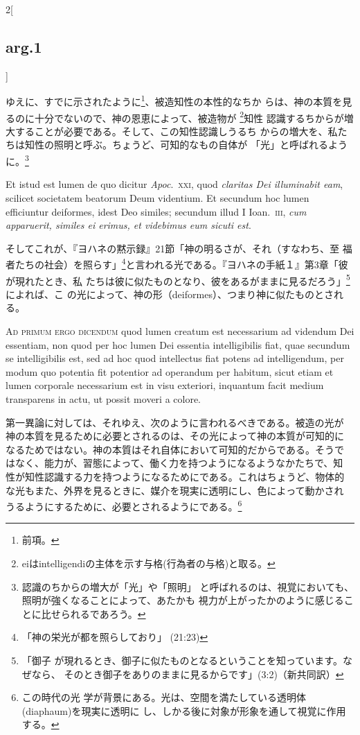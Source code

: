 \documentclass[paper=a4paper,fontsize=10pt,jafontsize=9pt,titlepage]{jlreq}
\begin{document}
\begin{paracol}{2}[\subsection{arg.1}]
\switchcolumn

ゆえに、すでに示されたように\footnote{前項。}、被造知性の本性的なちか
らは、神の本質を見るのに十分でないので、神の恩恵によって、被造物が
\footnote{eiはintelligendiの主体を示す与格(行為者の与格)と取る。}知性
認識するちからが増大することが必要である。そして、この知性認識しうるち
からの増大を、私たちは知性の照明と呼ぶ。ちょうど、可知的なもの自体が
「光」と呼ばれるように。\footnote{認識のちからの増大が「光」や「照明」
 と呼ばれるのは、視覚においても、照明が強くなることによって、あたかも
 視力が上がったかのように感じることに比せられるであろう。}

\switchcolumn*

Et istud est lumen de quo
dicitur {\itshape Apoc}.~{\scshape xxi}, quod {\itshape claritas Dei illuminabit
eam}, scilicet societatem beatorum Deum videntium. Et secundum hoc
lumen efficiuntur deiformes, idest Deo similes; secundum illud I
Ioan.\ {\scshape iii}, {\itshape cum apparuerit, similes ei erimus, et videbimus
eum sicuti est}.

\switchcolumn

そしてこれが、『ヨハネの黙示録』21節「神の明るさが、それ（すなわち、至
福者たちの社会）を照らす」\footnote{「神の栄光が都を照らしており」
(21:23)}と言われる光である。『ヨハネの手紙１』第3章「彼が現れたとき、私
たちは彼に似たものとなり、彼をあるがままに見るだろう」\footnote{「御子
が現れるとき、御子に似たものとなるということを知っています。なぜなら、
そのとき御子をありのままに見るからです」(3:2)（新共同訳）}によれば、こ
の光によって、神の形（deiformes）、つまり神に似たものとされる。

\switchcolumn*[\subsection{ad.1}]

{\scshape Ad primum ergo dicendum} quod lumen creatum est necessarium ad
videndum Dei essentiam, non quod per hoc lumen Dei essentia
intelligibilis fiat, quae secundum se intelligibilis est, sed ad hoc
quod intellectus fiat potens ad intelligendum, per modum quo potentia
fit potentior ad operandum per habitum, sicut etiam et lumen corporale
necessarium est in visu exteriori, inquantum facit medium transparens
in actu, ut possit moveri a colore.

\switchcolumn

第一異論に対しては、それゆえ、次のように言われるべきである。被造の光が
神の本質を見るために必要とされるのは、その光によって神の本質が可知的に
なるためではない。神の本質はそれ自体において可知的だからである。そうで
はなく、能力が、習態によって、働く力を持つようになるようなかたちで、知
性が知性認識する力を持つようになるためにである。これはちょうど、物体的
な光もまた、外界を見るときに、媒介を現実に透明にし、色によって動かされ
うるようにするために、必要とされるようにである。\footnote{この時代の光
学が背景にある。光は、空間を満たしている透明体(diaphaum)を現実に透明に
し、しかる後に対象が形象を通して視覚に作用する。}


\end{paracol}
\end{document}
